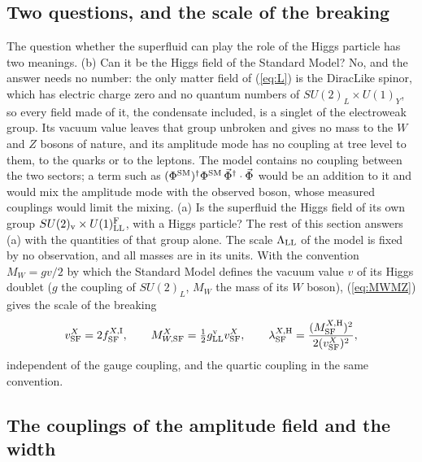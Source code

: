 \documentclass[aps,prd,onecolumn,superscriptaddress,nofootinbib,floatfix,longbibliography]{revtex4-2}
\newcommand{\LL}{{\rm LL}}
\newcommand{\SF}{{\rm SF}}
\begin{document}
\subsection{Two questions, and the scale of the breaking}

The question whether the superfluid can play the role of the Higgs particle has two meanings. (b) Can it be the Higgs field
of the Standard Model? No, and the answer needs no number: the only matter field of (\ref{eq:L}) is the DiracLike spinor,
which has electric charge zero and no quantum numbers of $SU(2)_L\times U(1)_Y$, so every field made of it, the condensate
included, is a singlet of the electroweak group. Its vacuum value leaves that group unbroken and gives no mass to the $W$ and
$Z$ bosons of nature, and its amplitude mode has no coupling at tree level to them, to the quarks or to the leptons. The model
contains no coupling between the two sectors; a term such as $(\Phi^{\rm SM})^\dagger\Phi^{\rm SM}\,\vec\Phi^\dagger\cdot\vec\Phi$ would
be an addition to it and would mix the amplitude mode with the observed boson, whose measured couplings would limit the
mixing. (a) Is the superfluid the Higgs field of its own group $SU(2)_{\rm v}\times U(1)^{\rm F}_\LL$, with a Higgs particle? The
rest of this section answers (a) with the quantities of that group alone. The scale $\Lambda_\LL$ of the model is fixed by no
observation, and all masses are in its units. With the convention $M_W=gv/2$ by which the Standard Model defines the vacuum
value $v$ of its Higgs doublet ($g$ the coupling of $SU(2)_L$, $M_W$ the mass of its $W$ boson), (\ref{eq:MWMZ}) gives the scale
of the breaking
\begin{equation}
v^X_\SF=2f^{X,{\rm I}}_\SF,\qquad M^X_{W,\SF}=\tfrac12g^{\rm v}_\LL v^X_\SF,\qquad\lambda^{X,{\rm H}}_\SF=\frac{(M^{X,{\rm H}}_\SF)^2}{2(v^X_\SF)^2},
\label{eq:vSF}
\end{equation}
independent of the gauge coupling, and the quartic coupling in the same convention.

\subsection{The couplings of the amplitude field and the width}
\end{document}
